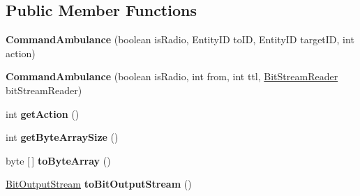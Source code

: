 \subsection*{Public Member Functions}
\begin{DoxyCompactItemize}
\item 
\hypertarget{classadf_1_1agent_1_1communication_1_1standard_1_1bundle_1_1topdown_1_1CommandAmbulance_ad1a27204ff06b816f7ae46e878a5f06d}{}\label{classadf_1_1agent_1_1communication_1_1standard_1_1bundle_1_1topdown_1_1CommandAmbulance_ad1a27204ff06b816f7ae46e878a5f06d} 
{\bfseries Command\+Ambulance} (boolean is\+Radio, Entity\+ID to\+ID, Entity\+ID target\+ID, int action)
\item 
\hypertarget{classadf_1_1agent_1_1communication_1_1standard_1_1bundle_1_1topdown_1_1CommandAmbulance_a2f2920c0847d04bf2436ce93ab97b426}{}\label{classadf_1_1agent_1_1communication_1_1standard_1_1bundle_1_1topdown_1_1CommandAmbulance_a2f2920c0847d04bf2436ce93ab97b426} 
{\bfseries Command\+Ambulance} (boolean is\+Radio, int from, int ttl, \hyperlink{classadf_1_1component_1_1communication_1_1util_1_1BitStreamReader}{Bit\+Stream\+Reader} bit\+Stream\+Reader)
\item 
\hypertarget{classadf_1_1agent_1_1communication_1_1standard_1_1bundle_1_1topdown_1_1CommandAmbulance_a4798a6f63734c218d74123081fd3cdd3}{}\label{classadf_1_1agent_1_1communication_1_1standard_1_1bundle_1_1topdown_1_1CommandAmbulance_a4798a6f63734c218d74123081fd3cdd3} 
int {\bfseries get\+Action} ()
\item 
\hypertarget{classadf_1_1agent_1_1communication_1_1standard_1_1bundle_1_1topdown_1_1CommandAmbulance_a9875366e4a9fc0dffabc39d3432156b8}{}\label{classadf_1_1agent_1_1communication_1_1standard_1_1bundle_1_1topdown_1_1CommandAmbulance_a9875366e4a9fc0dffabc39d3432156b8} 
int {\bfseries get\+Byte\+Array\+Size} ()
\item 
\hypertarget{classadf_1_1agent_1_1communication_1_1standard_1_1bundle_1_1topdown_1_1CommandAmbulance_ad75c6f60cf0e1399076151080a2a145f}{}\label{classadf_1_1agent_1_1communication_1_1standard_1_1bundle_1_1topdown_1_1CommandAmbulance_ad75c6f60cf0e1399076151080a2a145f} 
byte \mbox{[}$\,$\mbox{]} {\bfseries to\+Byte\+Array} ()
\item 
\hypertarget{classadf_1_1agent_1_1communication_1_1standard_1_1bundle_1_1topdown_1_1CommandAmbulance_a737adfba5890836b96f169ad0b27acd7}{}\label{classadf_1_1agent_1_1communication_1_1standard_1_1bundle_1_1topdown_1_1CommandAmbulance_a737adfba5890836b96f169ad0b27acd7} 
\hyperlink{classadf_1_1component_1_1communication_1_1util_1_1BitOutputStream}{Bit\+Output\+Stream} {\bfseries to\+Bit\+Output\+Stream} ()

\end{DoxyCompactItemize}
